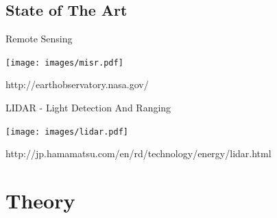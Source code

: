 \documentclass[compress,red,12pt]{beamer}
\begin{document}

\subsection{State of The Art}


\begin{frame}{Remote Sensing}
  \begin{center}
    \texttt{[image: images/misr.pdf]}
  \end{center}
  \begin{flushright}
    {\tiny http://earthobservatory.nasa.gov/}
  \end{flushright}
  {
  }
\end{frame}


\begin{frame}{LIDAR - Light Detection And Ranging}
  \begin{center}
    \texttt{[image: images/lidar.pdf]}
  \end{center}

  \begin{flushright}
    {\tiny http://jp.hamamatsu.com/en/rd/technology/energy/lidar.html}
  \end{flushright}
  {
  }
\end{frame}


\section{Theory}

\end{document}
